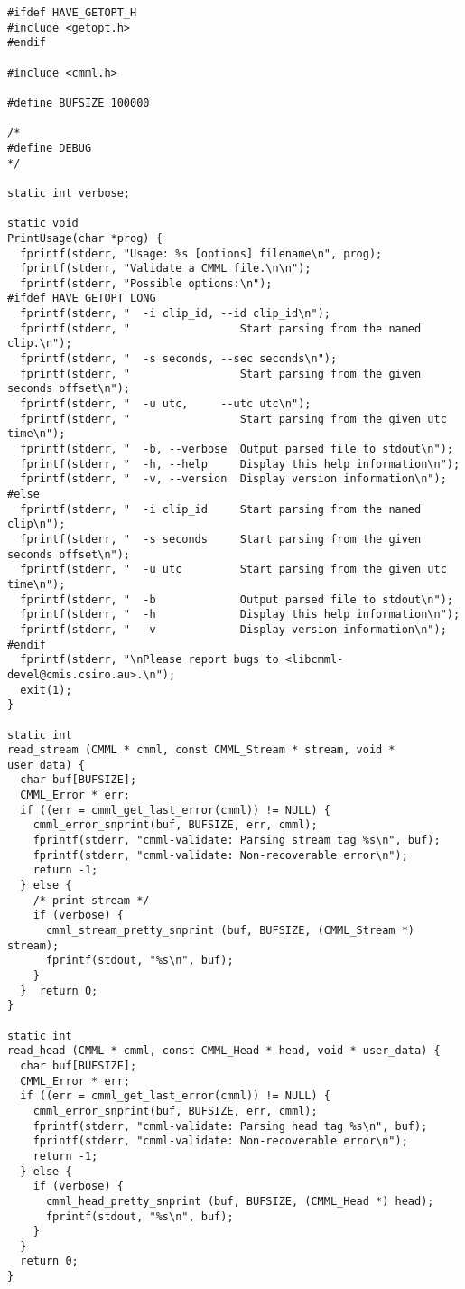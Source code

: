 \begin{verbatim}
#ifdef HAVE_GETOPT_H
#include <getopt.h>
#endif

#include <cmml.h>

#define BUFSIZE 100000

/*
#define DEBUG
*/

static int verbose;

static void
PrintUsage(char *prog) {
  fprintf(stderr, "Usage: %s [options] filename\n", prog);
  fprintf(stderr, "Validate a CMML file.\n\n");
  fprintf(stderr, "Possible options:\n");
#ifdef HAVE_GETOPT_LONG
  fprintf(stderr, "  -i clip_id, --id clip_id\n");
  fprintf(stderr, "                 Start parsing from the named clip.\n");
  fprintf(stderr, "  -s seconds, --sec seconds\n");
  fprintf(stderr, "                 Start parsing from the given seconds offset\n");
  fprintf(stderr, "  -u utc,     --utc utc\n");
  fprintf(stderr, "                 Start parsing from the given utc time\n");
  fprintf(stderr, "  -b, --verbose  Output parsed file to stdout\n");
  fprintf(stderr, "  -h, --help     Display this help information\n");
  fprintf(stderr, "  -v, --version  Display version information\n");
#else
  fprintf(stderr, "  -i clip_id     Start parsing from the named clip\n");
  fprintf(stderr, "  -s seconds     Start parsing from the given seconds offset\n");
  fprintf(stderr, "  -u utc         Start parsing from the given utc time\n");
  fprintf(stderr, "  -b             Output parsed file to stdout\n");
  fprintf(stderr, "  -h             Display this help information\n");
  fprintf(stderr, "  -v             Display version information\n");
#endif
  fprintf(stderr, "\nPlease report bugs to <libcmml-devel@cmis.csiro.au>.\n");
  exit(1);
}

static int
read_stream (CMML * cmml, const CMML_Stream * stream, void * user_data) {
  char buf[BUFSIZE];
  CMML_Error * err;
  if ((err = cmml_get_last_error(cmml)) != NULL) {
    cmml_error_snprint(buf, BUFSIZE, err, cmml);
    fprintf(stderr, "cmml-validate: Parsing stream tag %s\n", buf);
    fprintf(stderr, "cmml-validate: Non-recoverable error\n");
    return -1;
  } else {
    /* print stream */
    if (verbose) {
      cmml_stream_pretty_snprint (buf, BUFSIZE, (CMML_Stream *) stream);
      fprintf(stdout, "%s\n", buf);
    }
  }  return 0;
}

static int
read_head (CMML * cmml, const CMML_Head * head, void * user_data) {
  char buf[BUFSIZE];
  CMML_Error * err;
  if ((err = cmml_get_last_error(cmml)) != NULL) {
    cmml_error_snprint(buf, BUFSIZE, err, cmml);
    fprintf(stderr, "cmml-validate: Parsing head tag %s\n", buf);
    fprintf(stderr, "cmml-validate: Non-recoverable error\n");
    return -1;
  } else {
    if (verbose) {
      cmml_head_pretty_snprint (buf, BUFSIZE, (CMML_Head *) head);
      fprintf(stdout, "%s\n", buf);
    }
  }
  return 0;
}


\end{verbatim}
